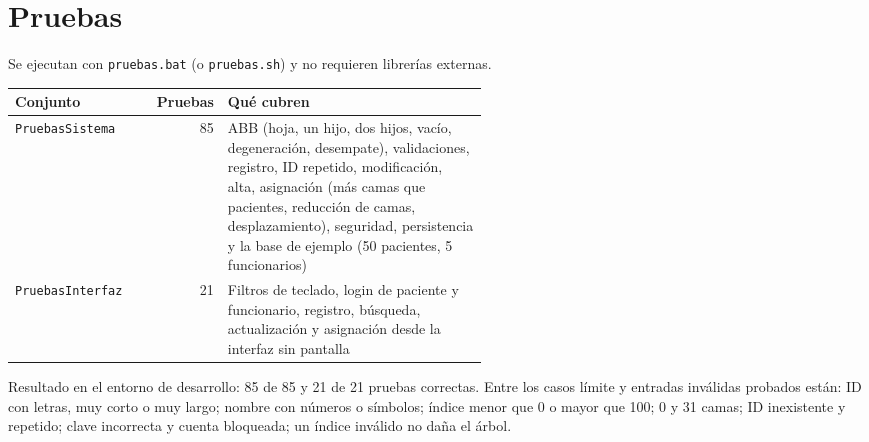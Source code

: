 \documentclass[11pt,a4paper]{article}
\begin{document}
\section{Pruebas}
Se ejecutan con \texttt{pruebas.bat} (o \texttt{pruebas.sh}) y no requieren librerías externas.
\begin{center}
\begin{tabular}{@{}lrp{0.55\linewidth}@{}}
\toprule \textbf{Conjunto} & \textbf{Pruebas} & \textbf{Qué cubren}\\ \midrule
\texttt{PruebasSistema} & 85 & ABB (hoja, un hijo, dos hijos, vacío, degeneración, desempate), validaciones, registro, ID repetido, modificación, alta, asignación (más camas que pacientes, reducción de camas, desplazamiento), seguridad, persistencia y la base de ejemplo (50 pacientes, 5 funcionarios)\\
\texttt{PruebasInterfaz} & 21 & Filtros de teclado, login de paciente y funcionario, registro, búsqueda, actualización y asignación desde la interfaz sin pantalla\\
\bottomrule
\end{tabular}
\end{center}
Resultado en el entorno de desarrollo: 85 de 85 y 21 de 21 pruebas correctas. Entre los casos límite y entradas inválidas probados están: ID con letras, muy corto o muy largo; nombre con números o símbolos; índice menor que 0 o mayor que 100; 0 y 31 camas; ID inexistente y repetido; clave incorrecta y cuenta bloqueada; un índice inválido no daña el árbol.
\end{document}
